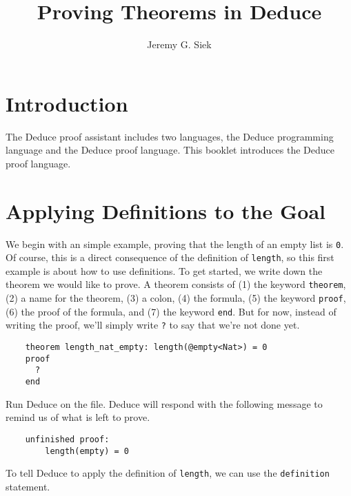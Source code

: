 \documentclass[12pt]{article}
\title{Proving Theorems in Deduce}
\author{Jeremy G. Siek}
\newif\ifBorder
\begin{document}

\Bordertrue

\maketitle


\tableofcontents

\pagebreak


\section{Introduction}

The Deduce proof assistant includes two languages, the Deduce
programming language and the Deduce proof language. This booklet
introduces the Deduce proof language.

\section{Applying Definitions to the Goal}

We begin with an simple example, proving that the length of an empty
list is \texttt{0}. Of course, this is a direct consequence of the
definition of \texttt{length}, so this first example is about how to
use definitions.  To get started, we write down the theorem we would
like to prove.  A theorem consists of (1) the keyword
\texttt{theorem}, (2) a name for the theorem, (3) a colon, (4) the
formula, (5) the keyword \texttt{proof}, (6) the proof of the formula,
and (7) the keyword \texttt{end}. But for now, instead of writing the
proof, we'll simply write \texttt{?} to say that we're not done yet.

\begin{verbatim}
    theorem length_nat_empty: length(@empty<Nat>) = 0
    proof
      ?
    end
\end{verbatim}

\noindent Run Deduce on the file. Deduce will respond with the following message
to remind us of what is left to prove.

\begin{verbatim}
    unfinished proof:
        length(empty) = 0
\end{verbatim}

To tell Deduce to apply the definition of \texttt{length}, we can use
the \texttt{definition} statement.
\end{document}
